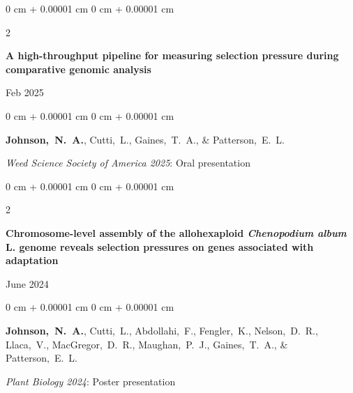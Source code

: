 \documentclass[10pt, letterpaper]{article}
\newenvironment{onecolentry}{
    \begin{adjustwidth}{
        0 cm + 0.00001 cm
    }{
        0 cm + 0.00001 cm
    }
}{
    \end{adjustwidth}
} %
\newenvironment{twocolentry}[2][]{
    \onecolentry
    \def\secondColumn{#2}
    \setcolumnwidth{\fill, 4.5 cm}
    \begin{paracol}{2}
}{
    \switchcolumn \raggedleft \secondColumn
    \end{paracol}
    \endonecolentry
} %
\begin{document}
        
        \begin{samepage}
            \begin{twocolentry}{
                Feb 2025
                }
                \textbf{A high-throughput pipeline for measuring selection pressure during comparative genomic analysis}
            \end{twocolentry}

            \vspace{0.10 cm}
            
            \begin{onecolentry}
                \mbox{\textbf{Johnson, N. A.}}, \mbox{Cutti, L.}, \mbox{Gaines, T. A.}, \& \mbox{Patterson, E. L.}

                \vspace{0.10 cm}
                
                \textit{Weed Science Society of America 2025}: Oral presentation
            \end{onecolentry}
        \end{samepage}


        \vspace{0.2 cm}

        
        \begin{samepage}
            \begin{twocolentry}{
                June 2024
                }
                \textbf{Chromosome-level assembly of the allohexaploid \textit{Chenopodium album} L. genome reveals selection pressures on genes associated with adaptation}
            \end{twocolentry}

            \vspace{0.10 cm}
            
            \begin{onecolentry}
                \mbox{\textbf{Johnson, N. A.}}, \mbox{Cutti, L.}, \mbox{Abdollahi, F.}, \mbox{Fengler, K.}, \mbox{Nelson, D. R.}, \mbox{Llaca, V.}, \mbox{MacGregor, D. R.}, \mbox{Maughan, P. J.}, \mbox{Gaines, T. A.}, \& \mbox{Patterson, E. L.}

                \vspace{0.10 cm}
                
                \textit{Plant Biology 2024}: Poster presentation
            \end{onecolentry}
        \end{samepage}


        \vspace{0.2 cm}
        
\end{document}
